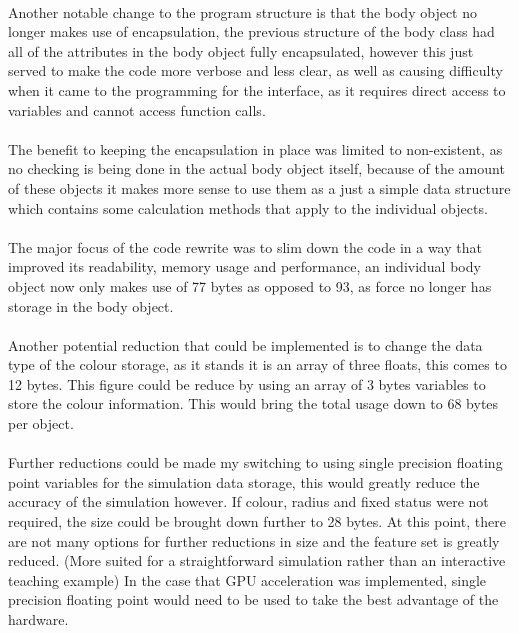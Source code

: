 {\paragraph{}
Another notable change to the program structure is that the body object no longer makes use of encapsulation, the previous structure of the body class had all of the attributes in the body object fully encapsulated, however this just served to make the code more verbose and less clear, as well as causing difficulty when it came to the programming for the interface, as it requires direct access to variables and cannot access function calls.

\paragraph{}
The benefit to keeping the encapsulation in place was limited to non-existent, as no checking is being done in the actual body object itself, because of the amount of these objects it makes more sense to use them as a just a simple data structure which contains some calculation methods that apply to the individual objects.

\paragraph{}
The major focus of the code rewrite was to slim down the code in a way that improved its readability, memory usage and performance, an individual body object now only makes use of 77 bytes as opposed to 93, as force no longer has storage in the body object.

\paragraph{}
Another potential reduction that could be implemented is to change the data type of the colour storage, as it stands it is an array of three floats, this comes to 12 bytes. This figure could be reduce by using an array of 3 bytes variables to store the colour information. This would bring the total usage down to 68 bytes per object.

\paragraph{}
Further reductions could be made my switching to using single precision floating point variables for the simulation data storage, this would greatly reduce the accuracy of the simulation however. If colour, radius and fixed status were not required, the size could be brought down further to 28 bytes. At this point, there are not many options for further reductions in size and the feature set is greatly reduced. (More suited for a straightforward simulation rather than an interactive teaching example) In the case that GPU acceleration was implemented, single precision floating point would need to be used to take the best advantage of the hardware.

}
